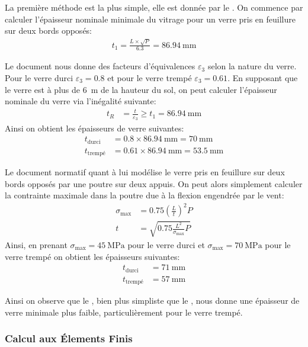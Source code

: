 \documentclass[11pt,titlepage]{article}
\begin{document}
La première méthode est la plus simple, elle est donnée par le \Textcite{dtu39}. On commence par calculer l'épaisseur nominale minimale du vitrage pour un verre pris en feuillure sur deux bords opposés:
\begin{align}
    t_1 = \frac{L \times \sqrt{P}}{6.3} = \qty{86.94}{\milli\meter}
\end{align}

Le document nous donne des facteurs d'équivalences $\varepsilon_3$ selon la nature du verre. Pour le verre durci $\varepsilon_3 = 0.8$ et pour le verre trempé $\varepsilon_3 = 0.61$. En supposant que le verre est à plus de \qty{6}{\metre} de la hauteur du sol, on peut calculer l'épaisseur nominale du verre via l'inégalité suivante:
\begin{align}
    t_R &= \frac{t}{\varepsilon_3} \geq t_1 =  \qty{86.94}{\milli\meter}
\end{align}
Ainsi on obtient les épaisseurs de verre suivantes:
\begin{align}
    t_{\text{durci}} &= 0.8\times \qty{86.94}{\milli\meter}= \qty{70}{\milli\meter}\\
    t_{\text{trempé}} &= 0.61 \times \qty{86.94}{\milli\meter} = \qty{53.5}{\milli\meter}
\end{align}

Le document normatif \Textcite{fdp78} quant à lui modélise le verre pris en feuillure sur deux bords opposés par une poutre sur deux appuis. On peut alors simplement calculer la contrainte maximale dans la poutre due à la flexion engendrée par le vent:
\begin{align}
    \sigma_{\text{max}} &= 0.75\left (\frac{L}{t}\right)^2 P \\
    t &= \sqrt{0.75\frac{L^2}{\sigma_{\text{max}}}P}
\end{align}
Ainsi, en prenant $\sigma_{\text{max}} = \qty{45}{\mega\pascal}$ pour le verre durci et $\sigma_{\text{max}} = \qty{70}{\mega\pascal}$ pour le verre trempé on obtient les épaisseurs suivantes:
\begin{align}
     t_{\text{durci}} &= \qty{71}{\milli\meter}\\
    t_{\text{trempé}} &= \qty{57}{\milli\meter}
\end{align}

Ainsi on observe que le \Textcite{dtu39}, bien plus simpliste que le \Textcite{fdp78}, nous donne une épaisseur de verre minimale plus faible, particulièrement pour le verre trempé.

\subsubsection{Calcul aux Élements Finis}\label{sec:temoin}
\end{document}
